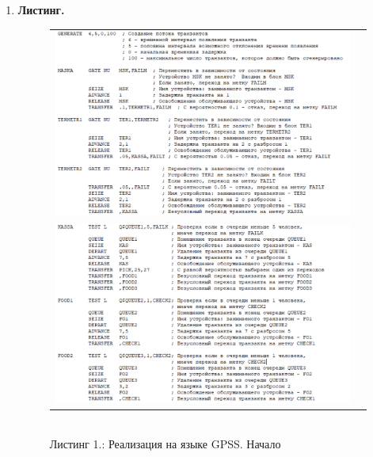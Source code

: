 \documentclass[a4paper,14pt]{extreport} %
\begin{document}
\begin{enumerate}
\newpage

\item \textbf{Листинг. }

\begin{figure}[H] \center
  \begin{tabular}{cc}
	\includegraphics[width=180mm]{lst1} \\
	\includegraphics[width=180mm]{lst2} \\
  \end{tabular}
  \\ Листинг 1.: Реализация на языке GPSS. Начало
\end{figure}


\end{enumerate}
\end{document}
